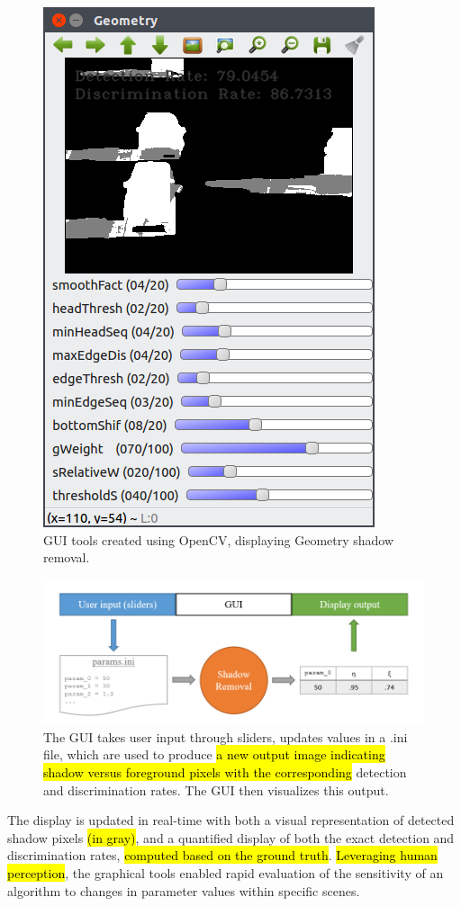 \begin{figure}
  \centering
  \includegraphics[width=.45\linewidth]{figures/geo_highway1_default.png}

\caption{GUI tools created using OpenCV, displaying Geometry shadow removal.}
\label{fig:guitools}
\end{figure}

\begin{figure}
  \centering
  \includegraphics[width=1\linewidth]{figures/gui_model.png}
  \caption{The GUI takes user input through sliders, updates values in a .ini file, which are used to produce \hl{a new output image indicating shadow versus foreground pixels with the corresponding} detection and discrimination rates. The GUI then visualizes this output.}
  \label{fig:guimodel}
\end{figure}

The display is updated in real-time with both a visual representation of detected shadow pixels \hl{(in gray)}, and a quantified display of both the exact detection and discrimination rates, \hl{computed based on the ground truth}. \hl{Leveraging human perception}, the graphical tools enabled rapid evaluation of the sensitivity of an algorithm to changes in parameter values within specific scenes.

